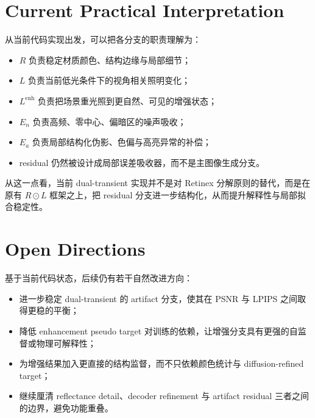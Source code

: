 \documentclass[11pt]{article}
\begin{document}
\section{Current Practical Interpretation}

从当前代码实现出发，可以把各分支的职责理解为：
\begin{itemize}[leftmargin=1.5em]
    \item $R$ 负责稳定材质颜色、结构边缘与局部细节；
    \item $L$ 负责当前低光条件下的视角相关照明变化；
    \item $L^{\text{enh}}$ 负责把场景重光照到更自然、可见的增强状态；
    \item $E_n$ 负责高频、零中心、偏暗区的噪声吸收；
    \item $E_a$ 负责局部结构化伪影、色偏与高亮异常的补偿；
    \item residual 仍然被设计成局部误差吸收器，而不是主图像生成分支。
\end{itemize}

从这一点看，当前 dual-transient 实现并不是对 Retinex 分解原则的替代，而是在原有 $R \odot L$ 框架之上，把 residual 分支进一步结构化，从而提升解释性与局部拟合稳定性。

\section{Open Directions}

基于当前代码状态，后续仍有若干自然改进方向：
\begin{itemize}[leftmargin=1.5em]
    \item 进一步稳定 dual-transient 的 artifact 分支，使其在 PSNR 与 LPIPS 之间取得更稳的平衡；
    \item 降低 enhancement pseudo target 对训练的依赖，让增强分支具有更强的自监督或物理可解释性；
    \item 为增强结果加入更直接的结构监督，而不只依赖颜色统计与 diffusion-refined target；
    \item 继续厘清 reflectance detail、decoder refinement 与 artifact residual 三者之间的边界，避免功能重叠。
\end{itemize}
\end{document}

